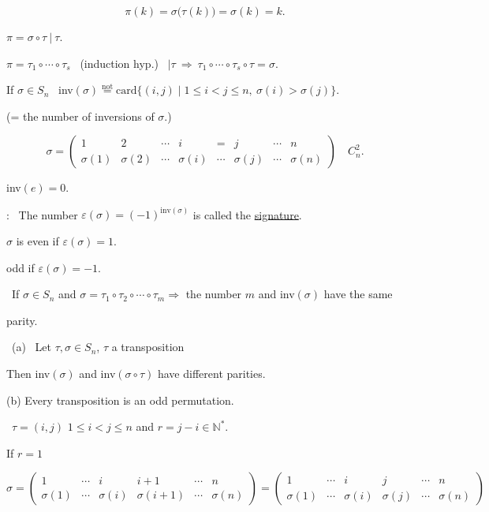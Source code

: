 \[
\pi(k) = \sigma\big(\tau(k)\big) = \sigma(k) = k.
\]

\noindent $\pi = \sigma\circ\tau \ \big| \ \tau.$

\bigskip
\noindent $\pi = \tau_1\circ\cdots\circ\tau_s$ \ (induction hyp.) \ $\big|\tau \ \Rightarrow \ \tau_1\circ\cdots\circ\tau_s\circ\tau=\sigma.$

\bigskip
\noindent If $\sigma\in S_n$ \ inv$(\sigma) \overset{\text{not}}{=} \text{card}\{(i,j) \mid 1\leq i<j\leq n,\ \sigma(i)>\sigma(j)\}.$

\noindent (= the number of inversions of $\sigma$.)

\[
\sigma = \begin{pmatrix}1&2&\cdots&i&=&j&\cdots&n\\ \sigma(1)&\sigma(2)&\cdots&\sigma(i)&\cdots&\sigma(j)&\cdots&\sigma(n)\end{pmatrix} \quad C_n^2.
\]

\noindent inv$(e)=0$.

\bigskip
\noindent{}: \ The number $\varepsilon(\sigma) = (-1)^{\text{inv}(\sigma)}$ is called the \underline{signature}.

\bigskip
\noindent $\sigma$ is even if $\varepsilon(\sigma)=1$.

\noindent \phantom{$\sigma$ is }odd if $\varepsilon(\sigma)=-1$.

\bigskip
\noindent{} \ If $\sigma\in S_n$ and $\sigma=\tau_1\circ\tau_2\circ\cdots\circ\tau_m \Rightarrow$ the number $m$ and inv$(\sigma)$ have the same

\noindent parity.

\bigskip
\noindent{} \ (a) \ Let $\tau,\sigma\in S_n$, $\tau$ a transposition

\noindent Then inv$(\sigma)$ and inv$(\sigma\circ\tau)$ have different parities.

\noindent (b) Every transposition is an odd permutation.

\bigskip
\noindent{} \ $\tau=(i,j)$ \quad $1\leq i<j\leq n$ and $r=j-i\in\mathbb{N}^*$.

\bigskip
\noindent If $r=1$

\[
\sigma = \begin{pmatrix}1&\cdots&i&i+1&\cdots&n\\ \sigma(1)&\cdots&\sigma(i)&\sigma(i+1)&\cdots&\sigma(n)\end{pmatrix}
= \begin{pmatrix}1&\cdots&i&j&\cdots&n\\ \sigma(1)&\cdots&\sigma(i)&\sigma(j)&\cdots&\sigma(n)\end{pmatrix}
\]

